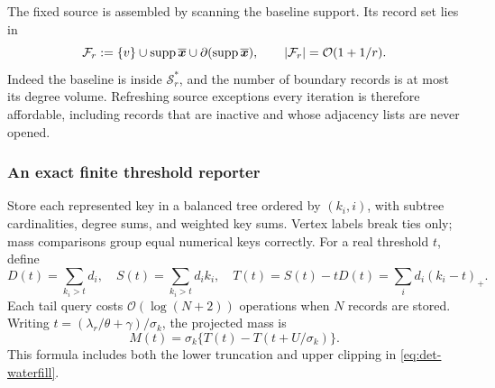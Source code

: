 The fixed source is assembled by scanning the baseline support. Its record
set lies in
\begin{equation*}
 \mathcal{F}_r:=\{v\}\cup\operatorname{supp}\overline{\bm{x}}\cup\partial(\operatorname{supp}\overline{\bm{x}}),
 \qquad |\mathcal{F}_r|=\mathcal{O}(1+1/r).
\end{equation*}
Indeed the baseline is inside $\mathcal S_r^*$, and the number of boundary
records is at most its degree volume. Refreshing source exceptions every
iteration is therefore affordable, including records that are inactive and
whose adjacency lists are never opened.

\subsubsection{An exact finite threshold reporter}

Store each represented key in a balanced tree ordered by $(k_i,i)$, with
subtree cardinalities, degree sums, and weighted key sums. Vertex labels
break ties only; mass comparisons group equal numerical keys correctly.
For a real threshold $t$, define
\begin{equation*}
 D(t)=\sum_{k_i>t}d_i,\quad
 S(t)=\sum_{k_i>t}d_i k_i,\quad
 T(t)=S(t)-tD(t)=\sum_i d_i(k_i-t)_+.
\end{equation*}
Each tail query costs $\mathcal{O}(\log(N+2))$ operations when $N$ records are stored.
Writing $t=(\lambda_r/\theta+\gamma)/\sigma_k$, the projected mass is
\begin{equation}
 M(t)=\sigma_k\{T(t)-T(t+U/\sigma_k)\}.
 \label{eq:det-mass-query}
\end{equation}
This formula includes both the lower truncation and upper clipping in
\cref{eq:det-waterfill}.


